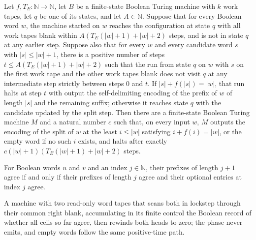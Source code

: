 \begin{lemma}
\label{Turing.FinTM.emitterSplit_of_body}
\leanok
{}
Let $f,T_E:\mathbb{N}\to\mathbb{N}$, let $B$ be a finite-state Boolean Turing machine
with $k$ work tapes, let $q$ be one of its states, and let $A\in\mathbb{N}$. Suppose
that for every Boolean word $w$, the machine started on $w$ reaches the configuration at
state $q$ with all work tapes blank within $A(T_E(|w|+1)+|w|+2)$ steps, and is not in
state $q$ at any earlier step. Suppose also that for every $w$ and every candidate word
$s$ with $|s|\le |w|+1$, there is a positive number of steps $t\le A(T_E(|w|+1)+|w|+2)$
such that the run from state $q$ on $w$ with $s$ on the first work tape and the other
work tapes blank does not visit $q$ at any intermediate step strictly between steps $0$
and $t$. If $|s|+f(|s|)=|w|$, that run halts at step $t$ with output the self-delimiting
encoding of the prefix of $w$ of length $|s|$ and the remaining suffix; otherwise it
reaches state $q$ with the candidate updated by the split step. Then there are a
finite-state Boolean Turing machine $M$ and a natural number $c$ such that, on every
input $w$, $M$ outputs the encoding of the split of $w$ at the least $i\le |w|$
satisfying $i+f(i)=|w|$, or the empty word if no such $i$ exists, and halts after
exactly $c(|w|+1)(T_E(|w|+1)+|w|+2)$ steps.
\end{lemma}

\begin{lemma}
\label{Turing.FinTM.emitter_take_succ_eq}
\leanok
{}
For Boolean words $u$ and $v$ and an index $j\in\mathbb{N}$, their prefixes of length
$j+1$ agree if and only if their prefixes of length $j$ agree and their optional entries
at index $j$ agree.
\end{lemma}

\begin{definition}
\label{Turing.FinTM.emitterCompareTM}
\leanok
{}
A machine with two read-only word tapes that scans both in lockstep through
their common right blank, accumulating in its finite control the Boolean
record of whether all cells so far agree, then rewinds both heads to zero;
the phase never emits, and empty words follow the same positive-time path.
\end{definition}

